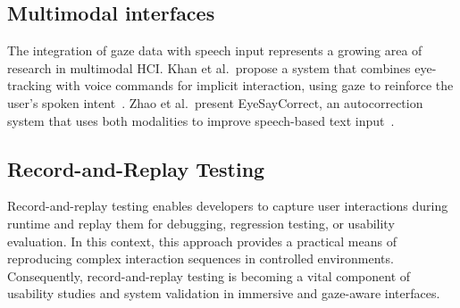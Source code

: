 \subsection{Multimodal interfaces}

The integration of gaze data with speech input represents a growing area of research in multimodal HCI. Khan et al.\ propose a system that combines eye-tracking with voice commands for implicit interaction, using gaze to reinforce the user's spoken intent~\cite{khan2022integrating}. Zhao et al.\ present EyeSayCorrect, an autocorrection system that uses both modalities to improve speech-based text input~\cite{zhao2022eyesaycorrect}.

%


\subsection{Record-and-Replay Testing}

Record-and-replay testing enables developers to capture user interactions during runtime and replay them for debugging, regression testing, or usability evaluation\cite{vasquez2018continuous, moran2016automatically}. In this context, this approach provides a practical means of reproducing complex interaction sequences in controlled environments. Consequently, record-and-replay testing is becoming a vital component of usability studies and system validation in immersive and gaze-aware interfaces.


